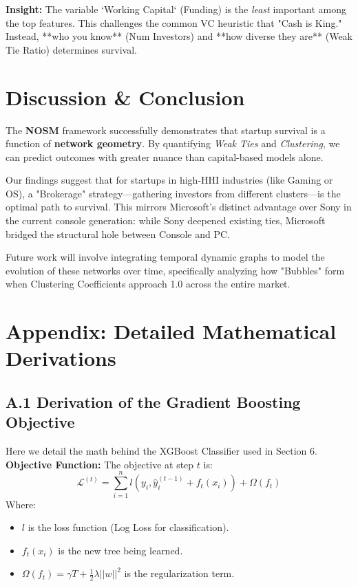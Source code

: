 \documentclass[11pt, a4paper]{article}
\begin{document}
\textbf{Insight:} The variable `Working Capital` (Funding) is the \textit{least} important among the top features. This challenges the common VC heuristic that "Cash is King." Instead, **who you know** (Num Investors) and **how diverse they are** (Weak Tie Ratio) determines survival.

\section{Discussion & Conclusion}

The \textbf{NOSM} framework successfully demonstrates that startup survival is a function of \textbf{network geometry}. By quantifying \textit{Weak Ties} and \textit{Clustering}, we can predict outcomes with greater nuance than capital-based models alone.

Our findings suggest that for startups in high-HHI industries (like Gaming or OS), a "Brokerage" strategy---gathering investors from different clusters---is the optimal path to survival. This mirrors Microsoft's distinct advantage over Sony in the current console generation: while Sony deepened existing ties, Microsoft bridged the structural hole between Console and PC.

Future work will involve integrating temporal dynamic graphs to model the evolution of these networks over time, specifically analyzing how "Bubbles" form when Clustering Coefficients approach 1.0 across the entire market.

\newpage
\appendix
\section{Appendix: Detailed Mathematical Derivations}

\subsection{A.1 Derivation of the Gradient Boosting Objective}
Here we detail the math behind the XGBoost Classifier used in Section 6.
\textbf{Objective Function:}
The objective at step $t$ is:
\begin{equation}
    \mathcal{L}^{(t)} = \sum_{i=1}^n l(y_i, \hat{y}_i^{(t-1)} + f_t(x_i)) + \Omega(f_t)
\end{equation}
Where:
\begin{itemize}
    \item $l$ is the loss function (Log Loss for classification).
    \item $f_t(x_i)$ is the new tree being learned.
    \item $\Omega(f_t) = \gamma T + \frac{1}{2}\lambda ||w||^2$ is the regularization term.
\end{itemize}
\end{document}
